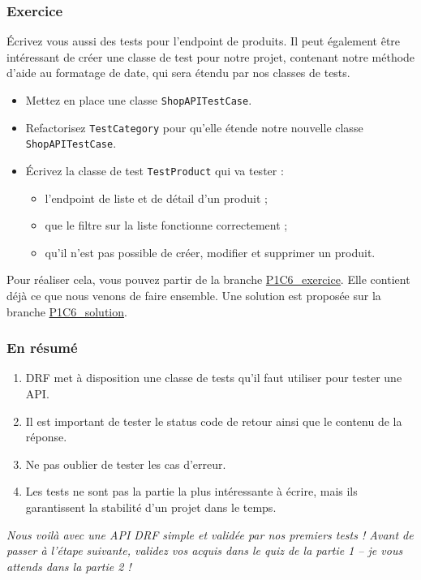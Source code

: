 \subsubsection*{Exercice}
Écrivez vous aussi des tests pour l’endpoint de produits. Il peut également être intéressant de créer une classe de test pour notre projet, contenant notre méthode d’aide au formatage de date, qui sera étendu par nos classes de tests.
\begin{itemize}
\item Mettez en place une classe {\tt ShopAPITestCase}.
\item Refactorisez  {\tt TestCategory}  pour qu’elle étende notre nouvelle classe  {\tt ShopAPITestCase}.
\item Écrivez la classe de test  {\tt TestProduct}  qui va tester :
\begin{itemize}
\item l’endpoint de liste et de détail d’un produit ;
\item que le filtre sur la liste fonctionne correctement ;
\item qu’il n’est pas possible de créer, modifier et supprimer un produit.
\end{itemize}
\end{itemize}
Pour réaliser cela, vous pouvez partir de la branche \href{https://github.com/OpenClassrooms-Student-Center/7192416\_APIs\_DRF/tree/P1C6\_exercice}{P1C6\_exercice}. Elle contient déjà ce que nous venons de faire ensemble. Une solution est proposée sur la branche \href{https://github.com/OpenClassrooms-Student-Center/7192416\_APIs\_DRF/tree/P1C6\_solution}{P1C6\_solution}.

\subsubsection*{En résumé}
\begin{enumerate}
\item DRF met à disposition une classe de tests qu’il faut utiliser pour tester une API.
\item Il est important de tester le status code de retour ainsi que le contenu de la réponse.
\item Ne pas oublier de tester les cas d’erreur.
\item Les tests ne sont pas la partie la plus intéressante à écrire, mais ils garantissent la stabilité d’un projet dans le temps.
\end{enumerate}
{\em Nous voilà avec une API DRF simple et validée par nos premiers tests ! Avant de passer à l’étape suivante, validez vos acquis dans le quiz de la partie 1 – je vous attends dans la partie 2 !}




%










